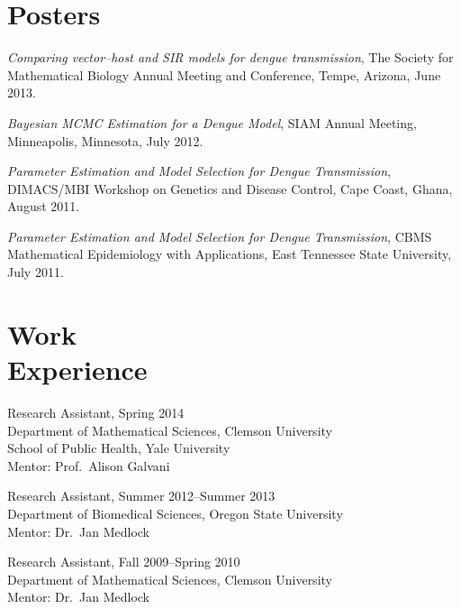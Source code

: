 \documentclass[margin,line,pifont,palatino,courier]{res}
\begin{document}
\begin{resume}





\section{\sc Posters}

\emph{Comparing vector--host and SIR models for dengue transmission},
The Society for Mathematical Biology Annual Meeting and Conference,
Tempe, Arizona, June 2013.

\emph{Bayesian MCMC Estimation for a Dengue Model}, SIAM Annual
Meeting, Minneapolis, Minnesota, July 2012.

\emph{Parameter Estimation and Model Selection for Dengue
  Transmission}, DIMACS/MBI Workshop on Genetics and Disease Control,
Cape Coast, Ghana, August 2011.

\emph{Parameter Estimation and Model Selection for Dengue
  Transmission}, CBMS Mathematical Epidemiology with Applications,
East Tennessee State University, July 2011.


\section{\sc Work \\ Experience}
Research Assistant, Spring 2014 \\
Department of Mathematical Sciences, Clemson University \\
School of Public Health, Yale University \\
Mentor: Prof.~Alison Galvani

Research Assistant, Summer 2012--Summer 2013 \\
Department of Biomedical Sciences, Oregon State University \\
Mentor: Dr.~Jan Medlock


Research Assistant, Fall 2009--Spring 2010 \\
Department of Mathematical Sciences, Clemson University \\
Mentor: Dr.~Jan Medlock


\end{resume}
\end{document}
